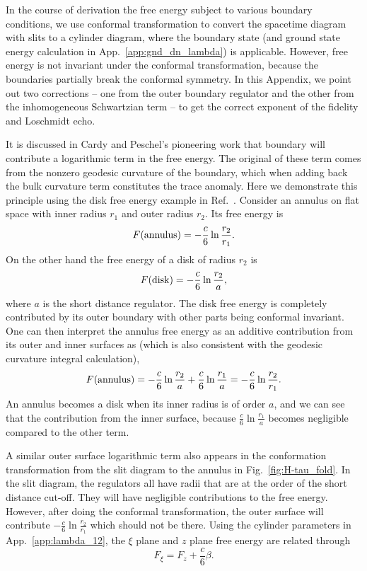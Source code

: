 
In the course of derivation the free energy subject to various boundary conditions, we use conformal transformation to convert the spacetime diagram with slits to a cylinder diagram, where the boundary state (and ground state energy calculation in App.~\ref{app:gnd_dn_lambda}) is applicable. However, free energy is not invariant under the conformal transformation, because the boundaries partially break the conformal symmetry. In this Appendix, we point out two corrections -- one from the outer boundary regulator and the other from the inhomogeneous Schwartzian term -- to get the correct exponent of the fidelity and Loschmidt echo. 

It is discussed in Cardy and Peschel's pioneering work\cite{cardy_finite-size_1988} that boundary will contribute a logarithmic term in the free energy. The original of these term comes from the nonzero geodesic curvature of the boundary, which when adding back the bulk curvature term constitutes the trace anomaly. Here we demonstrate this principle using the disk free energy example in Ref.~. Consider an annulus on flat space with inner radius $r_1$ and outer radius $r_2$. Its free energy is
\begin{equation}
F({\rm annulus}) = -  \frac{c}{6} \ln \frac{r_2}{r_1} .
\end{equation}
On the other hand the free energy of a disk of radius $r_2$ is
\begin{equation}
  F( {\rm disk} ) = - \frac{c}{6} \ln \frac{r_2}{a},
\end{equation}
where $a$ is the short distance regulator. The disk free energy is completely contributed by its outer boundary with other parts being conformal invariant. One can then interpret the annulus free energy as an additive contribution from its outer and inner surfaces as (which is also consistent with the geodesic curvature integral calculation),
\begin{equation}
F( {\rm annulus} ) = -  \frac{c}{6} \ln \frac{r_2}{a} +  \frac{c}{6} \ln \frac{r_1}{a} = - \frac{c}{6} \ln \frac{r_2}{r_1}.
\end{equation}
An annulus becomes a disk when its inner radius is of order $a$, and we can see that the contribution from the inner surface, because $\frac{c}{6} \ln \frac{r_1}{a}$ becomes negligible compared to the other term.  

A similar outer surface logarithmic term also appears in the conformation transformation from the slit diagram to the annulus in Fig.~\ref{fig:H-tau_fold}. In the slit diagram, the regulators all have radii that are at the order of the short distance cut-off. They will have negligible contributions to the free energy. However, after doing the conformal transformation, the outer surface will contribute $-\frac{c}{6} \ln \frac{r_2}{r_1}$ which should not be there. Using the cylinder parameters in App.~\ref{app:lambda_12}, the $\xi$ plane and $z$ plane free energy are related through
\begin{equation}
F_{\xi } = F_{z} + \frac{c}{6} \beta .
\end{equation}

